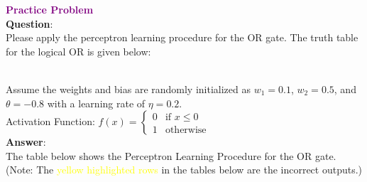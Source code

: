 \documentclass{book}
\begin{document}
\newpage
\textbf{\textcolor{purple}{\Large{Practice Problem}}}\\
\textbf{Question}:\\
Please apply the perceptron learning procedure for the OR gate. The truth table for the logical OR is given below:\\
\vspace{2mm}
\\
Assume the weights and bias are randomly initialized as \(w_1 = 0.1\), \(w_2 = 0.5\), and \(\theta = -0.8\) with a learning rate of \(\eta = 0.2\).\\
Activation Function: \(f(x) = \begin{cases}
    0 & \text{if } x \leq 0\\
    1 & \text{otherwise}
\end{cases}\)\\
\vspace{3mm}
\textbf{Answer}:\\
The table below shows the Perceptron Learning Procedure for the OR gate.\\
{\scriptsize(Note: The \textcolor{yellow}{yellow highlighted rows} in the tables below are the incorrect outputs.)}\\
\end{document}
